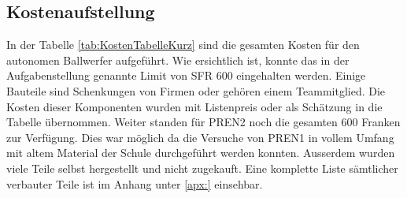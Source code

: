 \subsection{Kostenaufstellung}
In der Tabelle \ref{tab:KostenTabelleKurz} sind die gesamten Kosten für den autonomen 
Ballwerfer aufgeführt. Wie ersichtlich ist, konnte das in der Aufgabenstellung genannte 
Limit von SFR 600 eingehalten werden. Einige Bauteile sind Schenkungen von Firmen 
oder gehören einem Teammitglied. Die Kosten dieser Komponenten wurden mit Listenpreis 
oder als Schätzung in die Tabelle übernommen. Weiter standen für PREN2 noch die gesamten 
600 Franken zur Verfügung. Dies war möglich da die Versuche von PREN1 in vollem Umfang 
mit altem Material der Schule durchgeführt werden konnten. Ausserdem wurden viele Teile selbst 
hergestellt und nicht zugekauft. Eine komplette Liste sämtlicher verbauter Teile ist 
im Anhang unter \ref{apx:} einsehbar.

